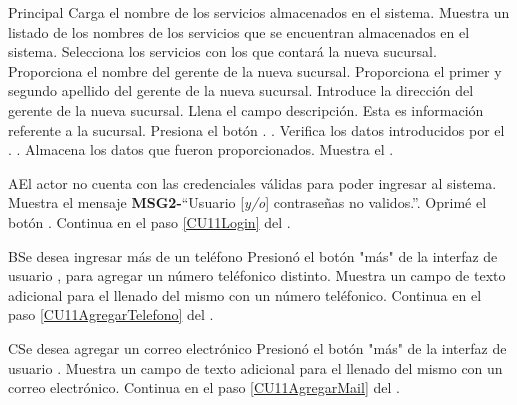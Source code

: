 \begin{UCtrayectoria}{Principal}
		\UCpaso Carga el nombre de los servicios almacenados en el sistema. \label{CU11ProblemServicios}
		\UCpaso	Muestra un listado de los nombres de los servicios que se encuentran almacenados en el sistema.
		\UCpaso[\UCactor] Selecciona los servicios con los que contará la nueva sucursal.
		\UCpaso[\UCactor] Proporciona el nombre del gerente de la nueva sucursal.
		\UCpaso[\UCactor] Proporciona el primer y segundo apellido del gerente de la nueva sucursal.
		\UCpaso[\UCactor] Introduce la dirección del gerente de la nueva sucursal.
		\UCpaso[\UCactor] Llena el campo descripción. Esta es información referente a la sucursal.
		\UCpaso[\UCactor] Presiona el botón . \label{CU11EnviarFormulario}.
		\UCpaso Verifica los datos introducidos por el \UCactor.  .
		\UCpaso Almacena los datos que fueron proporcionados.
		\UCpaso Muestra el . 
	\end{UCtrayectoria}
		
		\begin{UCtrayectoriaA}{A}{El actor no cuenta con las credenciales válidas para poder ingresar al sistema.}
			\UCpaso Muestra el mensaje {\bf MSG2-}``Usuario [{\em y/o}] contraseñas no validos.''.
			\UCpaso[\UCactor] Oprimé el botón .
			\UCpaso Continua en el paso \ref{CU11Login} del .
		\end{UCtrayectoriaA}
		
		\begin{UCtrayectoriaA}{B}{Se desea ingresar más de un teléfono}
			\UCpaso[\UCactor] Presionó el botón "más" de la interfaz de usuario , para agregar un número teléfonico distinto.
			\UCpaso Muestra un campo de texto adicional para el llenado del mismo con un número teléfonico.
			\UCpaso Continua en el paso \ref{CU11AgregarTelefono} del . 
		\end{UCtrayectoriaA}
		
		\begin{UCtrayectoriaA}{C}{Se desea agregar un correo electrónico}
			\UCpaso[\UCactor] Presionó el botón "más" de la interfaz de usuario .
			\UCpaso Muestra un campo de texto adicional para el llenado del mismo con un correo electrónico.
			\UCpaso Continua en el paso \ref{CU11AgregarMail} del . 
		\end{UCtrayectoriaA}		
		
